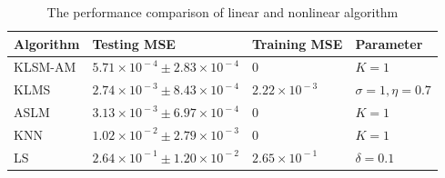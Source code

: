 \documentclass{article}
\begin{document}
\begin{table}[h] \footnotesize %
	\caption{\label{noNoise}The performance comparison of linear and nonlinear algorithm} %
	\begin{tabular}{|C{1.5cm}<{\centering}|p{3cm}<{\centering}|p{1cm}<{\centering}|p{1.4cm}<{\centering}|} %
		\hline  
		Algorithm & Testing MSE & Training MSE & Parameter\\ %
		\hline %
		\hline 
	    KLSM-AM & $\!\!\!\!5.71\! \times\! {10^{ \!-\! 4}} \pm 2.83\! \times \!{10^{ \!-\! 4}}\!\!\!\! $ & $ 0 $ & $ K=1 $\\  
	    \hline  
	    KLMS & $\!\!\!\!2.74\! \times\! {10^{ \!-\! 3}} \pm 8.43\! \times \!{10^{ \!-\! 4}}\!\!\!\! $ & $ \!\!\!\!2.22\!\! \times\!\! {10^{ \!-\! 3}} \!\!\!\!\!$ & $\!\!\!\! \sigma\!=\!1\!,\eta\!=\!0.7\!\!\!\! $\\  
		\hline  
		ASLM & $\!\!\!\!3.13\! \times\! {10^{ \!-\! 3}} \pm 6.97\! \times \!{10^{ \!-\! 4}}\!\!\!\! $ & $ 0 $ & $ K=1 $\\  
		\hline  
		KNN & $\!\!\!\!1.02\! \times\! {10^{ \!-\! 2}} \pm 2.79\! \times \!{10^{ \!-\!3}}\!\!\!\! $ & $ 0 $ & $ K=1 $\\ 
		\hline  
		LS & $\!\!\!\!2.64\! \times\! {10^{ \!-\! 1}} \pm 1.20\! \times \!{10^{ \!-\! 2}}\!\!\!\! $ & $ \!\!\!\!2.65\!\! \times\!\! {10^{ \!-\! 1}} \!\!\!\!\!$ & $ \delta=0.1 $\\
		\hline   
	\end{tabular}  
\end{table} 
\vspace{-2mm}
\end{document}
